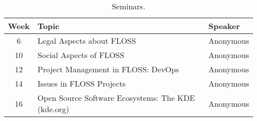 
\begin{table}[htb]
\caption{Seminars.} \label{tab:seminars}
\begin{tabular}{c|p{5cm}|l}
\hline
\textbf{Week} & \textbf{Topic} &
\textbf{Speaker} \\ \hline 

6 &
Legal Aspects about FLOSS & Anonymous 
\\
10 &
Social Aspects of FLOSS & Anonymous 
\\
12 &
Project Management in FLOSS: DevOps & Anonymous 
\\
14 &
Issues in FLOSS Projects & Anonymous 
\\
16 & Open Source Software Ecosystems: The KDE (kde.org) & Anonymous 
\\ \hline
\end{tabular}
\end{table}